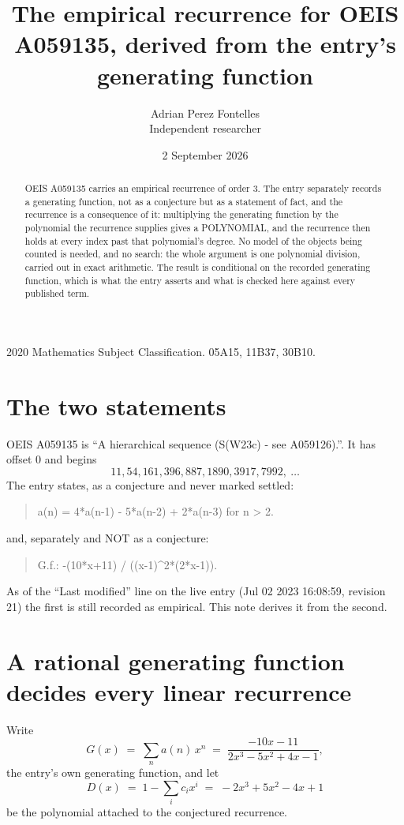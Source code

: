 \documentclass[11pt,a4paper]{article}
\title{The empirical recurrence for OEIS A059135, derived from the entry's generating function}
\author{Adrian Perez Fontelles\\ \small Independent researcher}
\date{2 September 2026}
\theoremstyle{plain}
\theoremstyle{definition}
\begin{document}
\maketitle

\begin{abstract}
OEIS A059135 carries an empirical recurrence of order $3$. The entry separately records a
generating function, not as a conjecture but as a statement of fact, and the recurrence is a
consequence of it: multiplying the generating function by the polynomial the recurrence
supplies gives a POLYNOMIAL, and the recurrence then holds at every index past that
polynomial's degree. No model of the objects being counted is needed, and no search: the
whole argument is one polynomial division, carried out in exact arithmetic. The result is
conditional on the recorded generating function, which is what the entry asserts and what is
checked here against every published term.
\end{abstract}

\noindent\small 2020 Mathematics Subject Classification. 05A15, 11B37, 30B10.\normalsize

\section{The two statements}

OEIS A059135 is ``A hierarchical sequence (S(W2{3}c) - see A059126).''. It has offset $0$ and begins
\[
11, 54, 161, 396, 887, 1890, 3917, 7992,\ \dots
\]
The entry states, as a conjecture and never marked settled:
\begin{quote}
a(n) = 4*a(n-1) - 5*a(n-2) + 2*a(n-3) for n > 2.
\end{quote}
and, separately and NOT as a conjecture:
\begin{quote}
G.f.: -(10*x+11) / ((x-1)\^{}2*(2*x-1)).
\end{quote}
As of the ``Last modified'' line on the live entry (Jul 02 2023 16:08:59, revision 21) the first is still
recorded as empirical. This note derives it from the second.

\section{A rational generating function decides every linear recurrence}

Write
\[
G(x)\;=\;\sum_{n}a(n)\,x^{n}\;=\;\frac{- 10 x - 11}{2 x^{3} - 5 x^{2} + 4 x - 1},
\]
the entry's own generating function, and let
\[
D(x)\;=\;1-\sum_i c_i x^{i}\;=\;- 2 x^{3} + 5 x^{2} - 4 x + 1
\]
be the polynomial attached to the conjectured recurrence.
\end{document}
